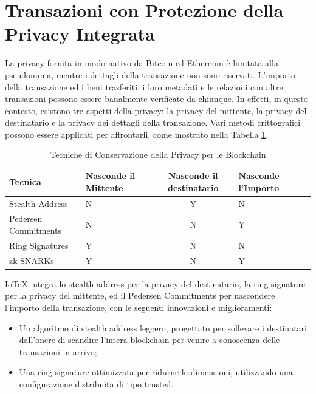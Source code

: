 \section{Transazioni con Protezione della Privacy Integrata}
La privacy fornita in modo nativo da Bitcoin ed Ethereum è limitata alla pseudonimia, mentre i dettagli della transazione non sono riservati. L'importo della transazione ed i beni trasferiti, i loro metadati e le relazioni con altre transazioni possono essere  banalmente verificate da chiunque. In effetti, in questo contesto, esistono tre aspetti della privacy: la privacy del mittente, la privacy del destinatario e la privacy dei dettagli della transazione. Vari metodi crittografici possono essere applicati per affrontarli, come mostrato nella Tabella \ref{table:PrivacyPreservingTechniques}.

\begin{table}[tp]%
	\caption{Tecniche di Conservazione della Privacy per le Blockchain}
	\label{table:PrivacyPreservingTechniques}\centering %
	\begin{tabular}{l|p{2cm}c|p{2.5cm}|p{2cm}}
		\hline
		Tecnica              & Nasconde il Mittente & Nasconde il destinatario & Nasconde l'Importo \\
		\hline
		Stealth Address      & N                    & Y                        & N                  \\
		Pedersen Commitments & N                    & N                        & Y                  \\
		Ring Signatures      & Y                    & N                        & N                  \\
		zk-SNARKs            & Y                    & N                        & Y                  \\
		\hline
	\end{tabular}
\end{table}

IoTeX integra lo stealth address per la privacy del destinatario, la ring signature per la privacy del mittente, ed il Pedersen Commitments per nascondere l'importo della transazione, con le seguenti innovazioni e miglioramenti:

\begin{itemize}
	\item Un algoritmo di stealth address leggero, progettato per sollevare i destinatari dall'onere di scandire l'intera blockchain per venire a conoscenza delle transazioni in arrivo;

	\item Una ring signature ottimizzata per ridurne le dimensioni, utilizzando una configurazione distribuita di tipo trusted.
\end{itemize}


